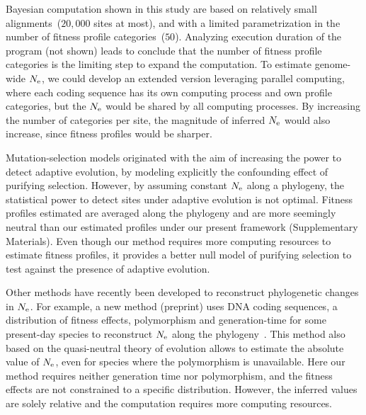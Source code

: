 Bayesian computation shown in this study are based on relatively small alignments~($20,000$ sites at most), and with a limited parametrization in the number of fitness profile categories~($50$).
Analyzing execution duration of the program (not shown) leads to conclude that the number of fitness profile categories is the limiting step to expand the computation.
To estimate genome-wide $N_{\mathrm{e}}$, we could develop an extended version leveraging parallel computing, where each coding sequence has its own computing process and own profile categories, but the $N_{\mathrm{e}}$ would be shared by all computing processes.
By increasing the number of categories per site, the magnitude of inferred $N_{\mathrm{e}}$ would also increase, since fitness profiles would be sharper.

Mutation-selection models originated with the aim of increasing the power to detect adaptive evolution, by modeling explicitly the confounding effect of purifying selection.
However, by assuming constant $N_{\mathrm{e}}$ along a phylogeny, the statistical power to detect sites under adaptive evolution is not optimal.
Fitness profiles estimated are averaged along the phylogeny and are more seemingly \gls{neutral} than our estimated profiles under our present framework (Supplementary Materials).
Even though our method requires more computing resources to estimate fitness profiles, it provides a better null model of purifying selection to test against the presence of adaptive evolution.

Other methods have recently been developed to reconstruct phylogenetic changes in $N_{\mathrm{e}}$.
For example, a new method (preprint) uses \acrshort{DNA} coding sequences, a distribution of fitness effects, polymorphism and generation-time for some present-day species to reconstruct $N_{\mathrm{e}}$ along the phylogeny~\citep{Brevet2019}.
This method also based on the quasi-neutral theory of evolution allows to estimate the absolute value of $N_{\mathrm{e}}$, even for species where the polymorphism is unavailable.
Here our method requires neither generation time nor polymorphism, and the fitness effects are not constrained to a specific distribution.
However, the inferred values are solely relative and the computation requires more computing resources.

